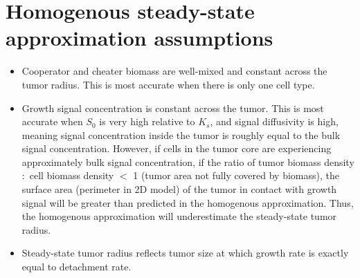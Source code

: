 \documentclass[11pt]{amsart}
\begin{document}
	\section{Homogenous steady-state approximation assumptions}
		\begin{flushleft}
			\begin{itemize}
				\item Cooperator and cheater biomass are well-mixed and constant across the tumor radius. This is most accurate when there is only one cell type.\\
				\item Growth signal concentration is constant across the tumor. This is most accurate when \(S_0\) is very high relative to \(K_s\), and signal diffusivity is high, meaning signal concentration inside the tumor is roughly equal to the bulk signal concentration. However, if cells in the tumor core are experiencing approximately bulk signal concentration, if the ratio of tumor biomass density \(:\) cell biomass density \(<\) 1 (tumor area not fully covered by biomass), the surface area (perimeter in 2D model) of the tumor in contact with growth signal will be greater than predicted in the homogenous approximation. Thus, the homogenous approximation will underestimate the steady-state tumor radius.\\
				\item Steady-state tumor radius reflects tumor size at which growth rate is exactly equal to detachment rate. \\
			\end{itemize}
		\end{flushleft}

	\newpage
\end{document}
